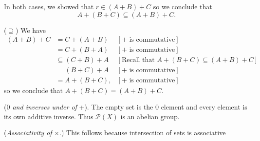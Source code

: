 \begin{enumerate}
\begin{enumerate}
               In both cases, we showed that $r \in (A + B) + C$ so
               we conclude that $$A + (B + C) \subseteq (A + B) + C.$$

               ($\supseteq$) We have
               \begin{align*}
                  (A + B) + C &= C + (A + B) &[\text{+ is commutative}] \\
                     &= C + (B + A) &[\text{+ is commutative}] \\
                     &\subseteq (C + B) + A &[\text{Recall that }
                     A + (B + C) \subseteq (A + B) + C] \\
                     &= (B + C) + A &[\text{+ is commutative}] \\
                     &= A + (B + C), &[\text{+ is commutative}]
               \end{align*}
               so we conclude that $A + (B + C) = (A + B) + C$.

               (\textit{$0$ and inverses under of }+). The empty set is the
               0 element and every element is its own additive inverse. Thus
               $\mathcal{P}(X)$ is an abelian group.

               (\textit{Associativity of }$\times$.) This follows because 
               intersection of sets is associative


\end{enumerate}
\end{enumerate}
